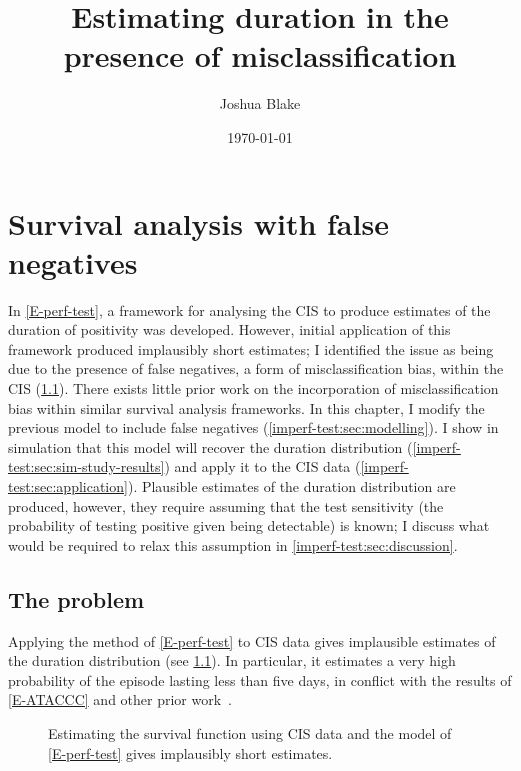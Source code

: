 \documentclass[thesis.tex]{subfiles}
\title{Estimating duration in the presence of misclassification}
\author{Joshua Blake}
\date{\today}
\begin{document}
\ifSubfilesClassLoaded{
  \setcounter{chapter}{5}
}

\chapter{Survival analysis with false negatives} \label{imperf-test}

In \cref{E-perf-test}, a framework for analysing the CIS to produce estimates of the duration of positivity was developed.
However, initial application of this framework produced implausibly short estimates; I identified the issue as being due to the presence of false negatives, a form of misclassification bias, within the CIS (\cref{imperf-test:sec:problem}).
There exists little prior work on the incorporation of misclassification bias within similar survival analysis frameworks.
In this chapter, I modify the previous model to include false negatives (\cref{imperf-test:sec:modelling}).
I show in simulation that this model will recover the duration distribution (\cref{imperf-test:sec:sim-study-results}) and apply it to the CIS data (\cref{imperf-test:sec:application}).
Plausible estimates of the duration distribution are produced, however, they require assuming that the test sensitivity (the probability of testing positive given being detectable) is known; I discuss what would be required to relax this assumption in \cref{imperf-test:sec:discussion}.

\section{The problem} \label{imperf-test:sec:problem}

Applying the method of \cref{E-perf-test} to CIS data gives implausible estimates of the duration distribution (see \cref{imperf-test:fig:problem-cis-estimates}).
In particular, it estimates a very high probability of the episode lasting less than five days, in conflict with the results of \cref{E-ATACCC} and other prior work~\autocite[e.g.:][]{cevikShedding}.

\begin{figure}
  \centering %
  \caption[Estimating survival using CIS data assuming perfect testing]{Estimating the survival function using CIS data and the model of \cref{E-perf-test} gives implausibly short estimates. \label{imperf-test:fig:problem-cis-estimates}}
\end{figure}
\end{document}
